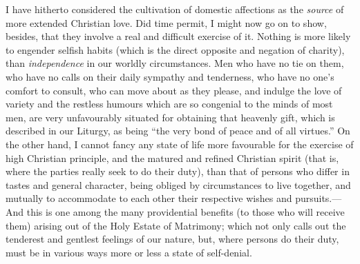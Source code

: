I have hitherto considered the cultivation of domestic affections
as the \emph{source} of more extended Christian love. Did time permit,
I might now go on to show, besides, that they involve a real and
difficult exercise of it. Nothing is more likely to engender selfish
habits (which is the direct opposite and negation of charity), than \emph{independence} in our worldly circumstances. Men who have no tie on
them, who have no calls on their daily sympathy and tenderness, who
have no one's comfort to consult, who can move about as they please,
and indulge the love of variety and the restless humours which are so
congenial to the minds of most men, are very unfavourably situated for
obtaining that heavenly gift, which is described in our Liturgy, as
being ``the very bond of peace and of all virtues.'' On the
other hand, I cannot fancy any state of life more favourable for the
exercise of high Christian principle, and the matured and refined
Christian spirit (that is, where the parties really seek to do their
duty), than that of persons who differ in tastes and general
character, being obliged by circumstances to live together, and
mutually to accommodate to each other their respective wishes and
pursuits.—And this is one among the many providential benefits (to
those who will receive them) arising out of the Holy Estate of
Matrimony; which not only calls out the tenderest and gentlest
feelings of our nature, but, where persons do their duty, must be in
various ways more or less a state of self-denial.

